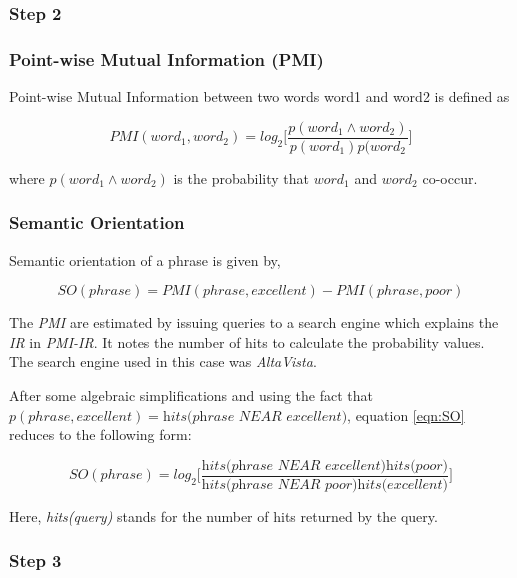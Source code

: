 \subsubsection*{Step 2}

\subsubsection*{Point-wise Mutual Information (PMI)}
Point-wise Mutual Information between two words word1 and word2 is defined as

\begin{equation}
PMI(word_1,word_2) = log_2 \Bigg[ \frac{p(word_1 \wedge word_2)}{p(word_1)p(word_2} \Bigg]
\end{equation}

where \(p(word_1 \wedge word_2 )\) is the probability that \(word_1\) and \(word_2\) co-occur.

\subsubsection*{Semantic Orientation}

Semantic orientation of a phrase is given by,

\begin{equation}
\label{eqn:SO}
SO(phrase) = PMI(phrase, excellent) - PMI(phrase,poor)
\end{equation}
  
The \textit{PMI} are estimated by issuing queries to a search engine which explains the \textit{IR} in \textit{PMI-IR}. It notes 
the number of hits to calculate the probability values. The search engine used in this case was \textit{AltaVista}.

After some algebraic simplifications and using the fact that \(p(phrase,excellent) = \textit{hits(phrase NEAR excellent)} \), 
equation \ref{eqn:SO} reduces to the following form:

\begin{equation}
SO(phrase) = log_2 \Bigg[ \frac{\textit{hits(phrase NEAR excellent)hits(poor)}}{\textit{hits(phrase NEAR poor)hits(excellent)}} \Bigg]
\end{equation}

Here, \textit{hits(query)} stands for the number of hits returned by the query.

\subsubsection*{Step 3}

